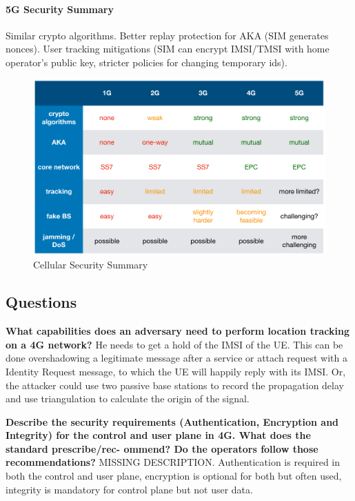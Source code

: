 \paragraph{5G Security Summary}
Similar crypto algorithms. Better replay protection for AKA (SIM generates
nonces). User tracking mitigations (SIM can encrypt IMSI/TMSI with home
operator's public key, stricter policies for changing temporary ids).

\begin{figure}[h]
	\centering
	\includegraphics[scale=0.5]{images/10-overview.png}
	\caption{Cellular Security Summary}%
	\label{fig:overview}
\end{figure}

\subsection{Questions}

\textbf{What capabilities does an adversary need to perform location tracking on a 4G network?} He needs to get a hold of the IMSI of the UE. This can be done overshadowing a legitimate message after a service or attach request with a Identity Request message, to which the UE will happily reply with its IMSI. Or, the attacker could use two passive base stations to record the propagation delay and use triangulation to calculate the origin of the signal.

\textbf{Describe the security requirements (Authentication, Encryption and Integrity) for the control and user plane in 4G. What does the standard prescribe/rec- ommend? Do the operators follow those recommendations?} MISSING DESCRIPTION. Authentication is required in both the control and user plane, encryption is optional for both but often used, integrity is mandatory for control plane but not user data.